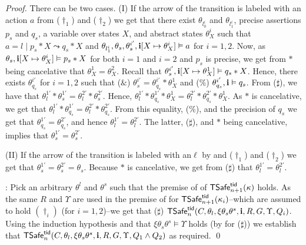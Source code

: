 \begin{proof}
There can be two cases.
(I) If the arrow of the transition is labeled with an action $a$
from  ($\dag_1$) and ($\dag_2$)
we get that there exist $\theta_{l^i_0}$ and $\theta_{l^i_1}$,   
precise assertions $p_s$ and $q_s$, a variable over states $X$, and abstract states $\theta^i_X$ 
such that $a = l \mid p_s * X \leadsto q_s * X$ and 
$\theta_{l^i_1},\theta_s,\theta^{i'}_s,{\bf i}[X \mapsto\theta^i_X] \vDash a$ for $i=1,2$.
Now, as $\theta_s,{\bf i}[X \mapsto\theta^i_X] \vDash p_s * X$ for both $i=1$ and $i=2$ and $p_s$ is precise,
we get from $*$ being cancelative that $\theta^1_X=\theta^2_X$.
Recall that $\theta^{i'}_s,{\bf i}[X \mapsto\theta^1_X]\vDash q_s * X$.
Hence, there exists $\theta_{q_s}^{i'}$ for $i=1,2$ such that 
($\&$) $\theta^{i'}_s = \theta_{q_s}^{i'} * \theta^1_X$ and ($\%$) $\theta_{q_s}^{i'},{\bf i}\vDash q_s$.
From ($\sharp$),  
we have that $\theta^{1'}_l * \theta^{1'}_s = \theta^{2'}_l * \theta^{2'}_s$.
Hence,
$\theta^{1'}_l * \theta_{q_s}^{1'} * \theta^1_X  = \theta^{2'}_l * \theta_{q_s}^{2'} * \theta^1_X$.
As $*$ is cancelative, we get that 
$\theta^{1'}_l * \theta_{q_s}^{1'}   = \theta^{2'}_l * \theta_{q_s}^{2'} $.
From this equality, ($\%$), and the precision of $q_s$ we get that $\theta_{q_s}^{1'} = \theta_{q_s}^{2'}$, 
and hence $\theta^{1'}_l = \theta^{2'}_l$.
The latter, ($\sharp$), and $*$ being cancelative, implies that $\theta^{1'}_s = \theta^{2'}_s$.
%

(II) If the arrow of the transition is labeled with an$\ell$
by  and  ($\dagger_1$) and ($\dagger_2$) 
we get that $\theta^{1'}_s = \theta^{2'}_s = \theta_s$.
Because $*$ is cancelative, we get from ($\sharp$) that  $\theta^{1'}_l = \theta^{2'}_l$.


: 
Pick an arbitrary $\theta^l$ and $\theta^s$ such that the 
premise of  of ${\sf TSafe}^{{\sf tid}}_{n+1}(\kappa)$ holds. 
As the same $R$ and $\Upsilon$ are used in the premise of 
 for ${\sf TSafe}^{{\sf tid}}_{n+1}(\kappa_i)$--which are assumed to 
hold $(\dag_i)$ (for $i=1,2$)--we get that ($\sharp$)
${\sf TSafe}^{{\sf tid}}_n(C,\theta_l,\xi\theta_s\theta^s,{\bf i},R,G,\Upsilon, Q_i)$.
Using the induction hypothesis and 
that
$\xi\theta_s\theta^s\vDash\Upsilon$ holds (by  for ($\sharp$))
we establish that 
${\sf TSafe}^{{\sf tid}}_n(C,\theta_l,\xi\theta_s\theta^s,{\bf i},R,G,\Upsilon, Q_1 \land Q_2)$
as required.
\qed\end{proof}


